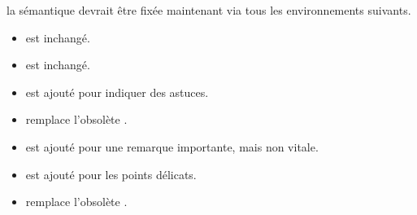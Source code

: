 

\begin{bdoctopic}
    la sémantique devrait être fixée maintenant via tous les environnements suivants.

    \begin{itemize}
        \item {} est inchangé.

        \item {} est inchangé.

        \item {} est ajouté pour indiquer des astuces.

        \item {} remplace l'obsolète .

        \item {} est ajouté pour une remarque importante, mais non vitale.

        \item {} est ajouté pour les points délicats.

        \item {} remplace l'obsolète .
    \end{itemize}
\end{bdoctopic}
